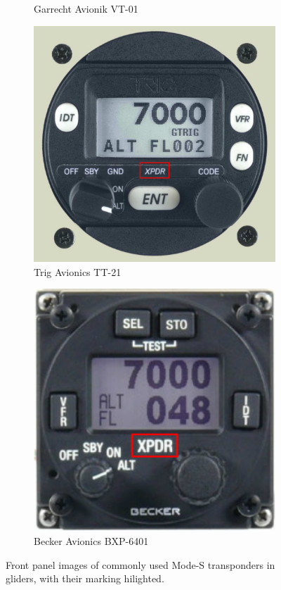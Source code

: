 \documentclass{article}
\begin{document}
\begin{figure}
\begin{subfigure}[b]{0.24\textwidth}
	\caption{Garrecht Avionik VT-01}
	\label{fig:vt01}
\end{subfigure}
\begin{subfigure}[b]{0.24\textwidth}
	\includegraphics[width=\textwidth]{tt21}
	\caption{Trig Avionics TT-21}
	\label{fig:tt21}
\end{subfigure}
\begin{subfigure}[b]{0.24\textwidth}
	\includegraphics[width=\textwidth]{bxp6401}
	\caption{Becker Avionics {BXP-6401}}
	\label{fig:bxp6401}
\end{subfigure}
\caption{Front panel images of commonly used Mode-S transponders in gliders, with their marking hilighted.}
\label{fig:transponders}
\end{figure}
\end{document}
